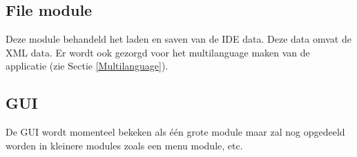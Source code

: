 \documentclass[]{article}
\begin{document}
\subsection{File module}
Deze module behandeld het laden en saven van de IDE data. Deze data omvat de XML data. Er wordt ook gezorgd voor het multilanguage maken van de applicatie (zie Sectie \ref{Multilanguage}).

\subsection{GUI}
De GUI wordt momenteel bekeken als \'{e}\'{e}n grote module maar zal nog opgedeeld worden in kleinere modules zoals een menu module, etc. 
\end{document}
